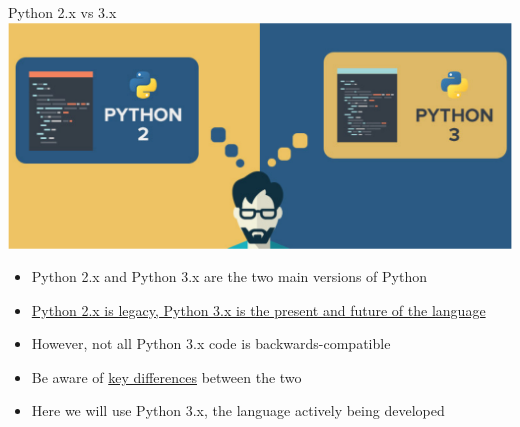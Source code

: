 \documentclass[pdf]{beamer}
\begin{document}

\begin{frame}{Python 2.x vs 3.x}
\centering
\includegraphics[width=.6\textwidth]{python2vs3.pdf}

\begin{itemize}\addtolength{\itemsep}{0.3\baselineskip}
	\item<1-> Python 2.x and Python 3.x are the two main versions of Python
	\item<2-> \href{https://wiki.python.org/moin/Python2orPython3}{Python 2.x is legacy, Python 3.x is the present and future of the language}
	\item<3-> However, not all Python 3.x code is backwards-compatible
	\item<4-> Be aware of \href{http://sebastianraschka.com/Articles/2014_python_2_3_key_diff.html}{key differences} between the two
	\item<5-> Here we will use Python 3.x, the language actively being developed
\end{itemize}
\end{frame}
\end{document}
